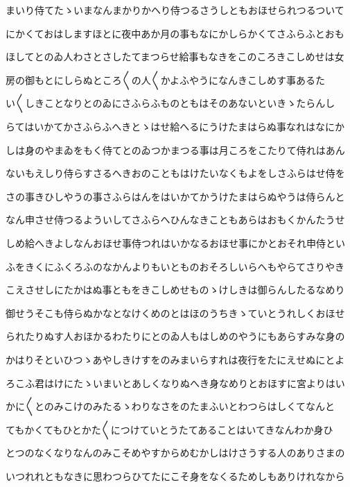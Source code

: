 \documentclass[a4paper,11pt,landscape]{ltjtarticle}
\begin{document}
\par\medskip
まいり侍てたゝいまなんまかりかへり侍つるさうしともおほせられつるついて
\par\medskip
にかくておはしますほとに夜中あか月の事もなにかしらかくてさふらふとおも
\par\medskip
ほしてとのゐ人わさとさしたてまつらせ給事もなきをこのころきこしめせは女
\par\medskip
房の御もとにしらぬところ〱の人〱かよふやうになんきこしめす事あるた
\par\medskip
い〱しきことなりとのゐにさふらふものともはそのあないといきゝたらんし
\par\medskip
らてはいかてかさふらふへきとゝはせ給へるにうけたまはらぬ事なれはなにか
\par\medskip
しは身のやまゐをもく侍てとのゐつかまつる事は月ころをこたりて侍れはあん
\par\medskip
ないもえしり侍らすさるへきおのこともはけたいなくもよをしさふらはせ侍を
\par\medskip
さの事きひしやうの事さふらはんをはいかてかうけたまはらぬやうは侍らんと
\par\medskip
なん申させ侍つるよういしてさふらへひんなきこともあらはおもくかんたうせ
\par\medskip
しめ給へきよしなんおほせ事侍つれはいかなるおほせ事にかとおそれ申侍とい
\par\medskip
ふをきくにふくろふのなかんよりもいとものおそろしいらへもやらてさりやき
\par\medskip
こえさせしにたかはぬ事ともをきこしめせものゝけしきは御らんしたるなめり
\par\medskip
御せうそこも侍らぬかなとなけくめのとはほのうちきゝていとうれしくおほせ
\par\medskip
られたりぬす人おほかるわたりにとのゐ人もはしめのやうにもあらすみな身の
\par\medskip
かはりそといひつゝあやしきけすをのみまいらすれは夜行をたにえせぬにとよ
\par\medskip
ろこふ君はけにたゝいまいとあしくなりぬへき身なめりとおほすに宮よりはい
\par\medskip
かに〱とのみこけのみたるゝわりなさをのたまふいとわつらはしくてなんと
\par\medskip
てもかくてもひとかた〱につけていとうたてあることはいてきなんわか身ひ
\par\medskip
とつのなくなりなんのみこそめやすからめむかしはけさうする人のありさまの
\par\medskip
いつれれともなきに思わつらひてたにこそ身をなくるためしもありけれなから
\par\medskip
\end{document}
